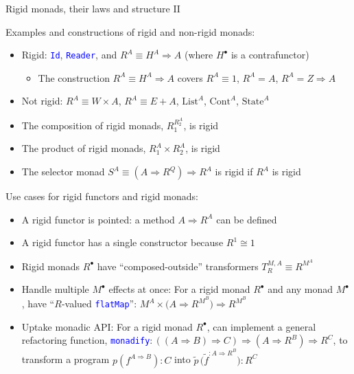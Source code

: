 \documentclass[english]{beamer}
\begin{document}
\begin{frame}{Rigid monads, their laws and structure II}

Examples and constructions of rigid and non-rigid monads:
\begin{itemize}
\item Rigid: \texttt{\textcolor{blue}{\footnotesize{}Id}}, \texttt{\textcolor{blue}{\footnotesize{}Reader}},
and $R^{A}\equiv H^{A}\Rightarrow A$ (where $H^{\bullet}$ is a contrafunctor)
\begin{itemize}
\item The construction $R^{A}\equiv H^{A}\Rightarrow A$ covers $R^{A}\equiv1$,
$R^{A}=A$, $R^{A}=Z\Rightarrow A$
\end{itemize}
\item Not rigid: $R^{A}\equiv W\times A$, $R^{A}\equiv E+A$, $\text{List}^{A}$,
$\text{Cont}^{A}$, $\text{State}^{A}$
\item The composition of rigid monads, $R_{1}^{R_{2}^{A}}$, is rigid
\item The product of rigid monads, $R_{1}^{A}\times R_{2}^{A}$, is rigid
\item The selector monad $S^{A}\equiv\left(A\Rightarrow R^{Q}\right)\Rightarrow R^{A}$
is rigid if $R^{A}$ is rigid
\end{itemize}
Use cases for rigid functors and rigid monads:
\begin{itemize}
\item A rigid functor is pointed: a method $A\Rightarrow R^{A}$ can be
defined
\item A rigid functor has a single constructor because $R^{1}\cong1$
\item Rigid monads $R^{\bullet}$ have ``composed-outside'' transformers
$T_{R}^{M,A}\equiv R^{M^{A}}$
\item Handle multiple $M^{\bullet}$ effects at once: For a rigid monad
$R^{\bullet}$ and any monad $M^{\bullet}$, have ``$R$-valued \texttt{\textcolor{blue}{\footnotesize{}flatMap}}'':
$M^{A}\times\big(A\Rightarrow R^{M^{B}}\big)\Rightarrow R^{M^{B}}$
\item Uptake monadic API: For a rigid monad $R^{\bullet}$, can implement
a general refactoring function, \texttt{\textcolor{blue}{\footnotesize{}monadify}}$:\left(\left(A\Rightarrow B\right)\Rightarrow C\right)\Rightarrow\left(A\Rightarrow R^{B}\right)\Rightarrow R^{C}$,
to transform a program $p\left(f^{A\Rightarrow B}\right):C$ into
$\tilde{p}\,\big(\tilde{f}^{:A\Rightarrow R^{B}}\big):R^{C}$
\end{itemize}
\end{frame}
\end{document}
